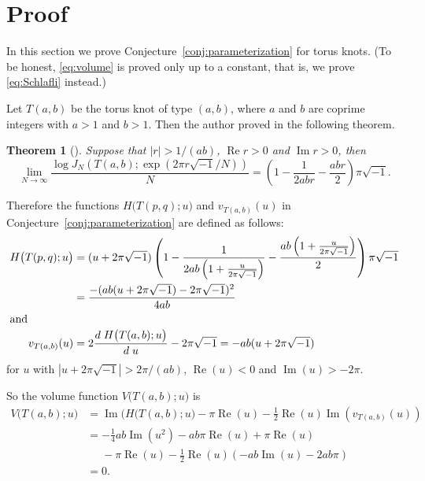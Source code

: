 \documentclass[a4paper]{amsart}
\theoremstyle{plain}
\newtheorem{thm}{Theorem}[section]
\theoremstyle{definition}
\theoremstyle{remark}
\renewcommand{\Re}{\operatorname{Re}}
\renewcommand{\Im}{\operatorname{Im}}
\numberwithin{equation}{section}
\begin{document}
\section{Proof}
In this section we prove Conjecture~\ref{conj:parameterization} for torus knots.
(To be honest, \eqref{eq:volume} is proved only up to a constant, that is, we prove \eqref{eq:Schlafli} instead.)
\par
Let $T(a,b)$ be the torus knot of type $(a,b)$, where $a$ and $b$ are coprime integers with $a>1$ and $b>1$.
Then the author proved in \cite[Theorem~1.1]{Murakami:INTJM62004} the following theorem.
\begin{thm}[\cite{Murakami:INTJM62004}]
Suppose that $|r|>1/(ab)$, $\Re{r}>0$ and $\Im{r}>0$, then
\begin{equation*}
  \lim_{N\to\infty}
  \frac{\log{J_N\left(T(a,b);\exp(2\pi r\sqrt{-1}/N)\right)}}{N}
  =
  \left(1-\frac{1}{2abr}-\frac{abr}{2}\right)\pi\sqrt{-1}.
\end{equation*}
\end{thm}
\par
Therefore the functions $H\bigl(T(p,q);u\bigr)$ and $v_{T(a,b)}(u)$ in Conjecture~\ref{conj:parameterization} are defined as follows:
\begin{align*}
  H\bigl(T(p,q);u\bigr)
  &=
  (u+2\pi\sqrt{-1})
  \left(
    1
    -\frac{1}{2ab\left(1+\frac{u}{2\pi\sqrt{-1}}\right)}
    -\frac{ab\left(1+\frac{u}{2\pi\sqrt{-1}}\right)}{2}
  \right)
  \pi\sqrt{-1}
  \\
  &=
  \frac{-(ab(u+2\pi\sqrt{-1})-2\pi\sqrt{-1})^2}{4ab}
  \\
  \intertext{and}
  v_{T(a,b)}(u)
  &=
  2\frac{d\;H\bigl(T(a,b);u\bigr)}{d\;u}-2\pi\sqrt{-1}
  =
  -ab(u+2\pi\sqrt{-1})
\end{align*}
for $u$ with $|u+2\pi\sqrt{-1}|>2\pi/(ab)$, $\Re(u)<0$ and $\Im(u)>-2\pi$.
\par
So the volume function $V\bigl(T(a,b);u\bigr)$ is
\begin{equation*}
\begin{split}
  V\bigl(T(a,b);u\bigr)
  &=
  \Im{\bigl(H(T(a,b);u\bigr)}-\pi\Re(u)-\frac{1}{2}\Re(u)\Im(v_{T(a,b)}(u))
  \\
  &=
  -\frac{1}{4}ab\Im(u^2)
  -ab\pi\Re(u)
  +\pi\Re(u)
  \\
  &\phantom{=}
  -\pi\Re(u)
  -\frac{1}{2}\Re(u)(-ab\Im(u)-2ab\pi)
  \\
  &=
  0.
\end{split}
\end{equation*}
\par
\end{document}
